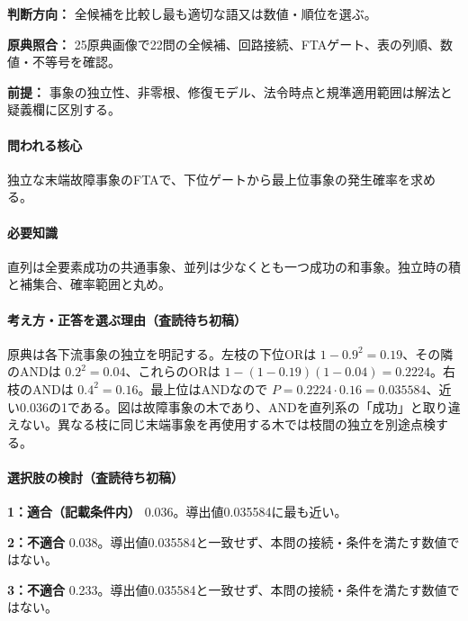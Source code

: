 \noindent\textbf{判断方向：} 全候補を比較し最も適切な語又は数値・順位を選ぶ。\par

\noindent\textbf{原典照合：} 25原典画像で22問の全候補、回路接続、FTAゲート、表の列順、数値・不等号を確認。\par

\noindent\textbf{前提：} 事象の独立性、非零根、修復モデル、法令時点と規準適用範囲は解法と疑義欄に区別する。\par

\paragraph{問われる核心} 独立な末端故障事象のFTAで、下位ゲートから最上位事象の発生確率を求める。

\paragraph{必要知識} 直列は全要素成功の共通事象、並列は少なくとも一つ成功の和事象。独立時の積と補集合、確率範囲と丸め。

\paragraph{考え方・正答を選ぶ理由（査読待ち初稿）} 原典は各下流事象の独立を明記する。左枝の下位ORは \(1-0.9^2=0.19\)、その隣のANDは \(0.2^2=0.04\)、これらのORは \(1-(1-0.19)(1-0.04)=0.2224\)。右枝のANDは \(0.4^2=0.16\)。最上位はANDなので \(P=0.2224\cdot0.16=0.035584\)、近い0.036の1である。図は故障事象の木であり、ANDを直列系の「成功」と取り違えない。異なる枝に同じ末端事象を再使用する木では枝間の独立を別途点検する。

\paragraph{選択肢の検討（査読待ち初稿）}\mbox{}\par

\noindent\textbf{1：適合（記載条件内）} 0.036。導出値0.035584に最も近い。\par

\noindent\textbf{2：不適合} 0.038。導出値0.035584と一致せず、本問の接続・条件を満たす数値ではない。\par

\noindent\textbf{3：不適合} 0.233。導出値0.035584と一致せず、本問の接続・条件を満たす数値ではない。\par

